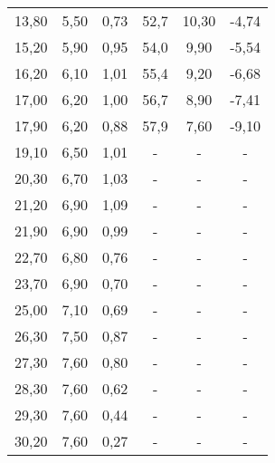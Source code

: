 \begin{table}[htp]
\begin{center}
\begin{tabular}{cccccc}
			13,80 & 5,50 & 0,73 & 52,7 & 10,30 & -4,74\\
			15,20 & 5,90 & 0,95 & 54,0 & 9,90 & -5,54\\
			16,20 & 6,10 & 1,01 & 55,4 & 9,20 & -6,68\\
			17,00 & 6,20 & 1,00 & 56,7 & 8,90 & -7,41\\
			17,90 & 6,20 & 0,88 & 57,9 & 7,60 & -9,10\\
			19,10 & 6,50 & 1,01 & - & - & -\\
			20,30 & 6,70 & 1,03 & - & - & -\\
			21,20 & 6,90 & 1,09 & - & - & -\\
			21,90 & 6,90 & 0,99 & - & - & -\\
			22,70 & 6,80 & 0,76 & - & - & -\\
			23,70 & 6,90 & 0,70 & - & - & -\\
			25,00 & 7,10 & 0,69 & - & - & -\\
			26,30 & 7,50 & 0,87 & - & - & -\\
			27,30 & 7,60 & 0,80 & - & - & -\\
			28,30 & 7,60 & 0,62 & - & - & -\\
			29,30 & 7,60 & 0,44 & - & - & -\\
			30,20 & 7,60 & 0,27 & - & - & -\\
      \bottomrule
      \end{tabular}
    \end{center}
  \end{table}

